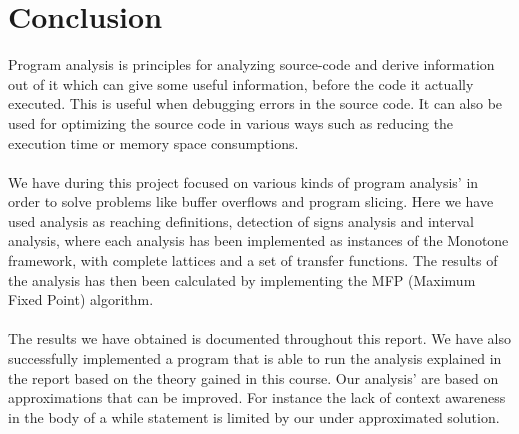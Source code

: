 \chapter{Conclusion}

Program analysis is principles for analyzing source-code and derive information out of it which can give some useful information, before the code it actually executed. This is useful when debugging errors in the source code. It can also be used for optimizing the source code in various ways such as reducing the execution time or memory space consumptions.
\\\\
We have during this project focused on various kinds of program analysis' in order to solve problems like buffer overflows and program slicing. Here we have used analysis as reaching definitions, detection of signs analysis and interval analysis, where each analysis has been implemented as instances of the Monotone framework, with complete lattices and a set of transfer functions.
The results of the analysis has then been calculated by implementing the MFP (Maximum Fixed Point) algorithm.
\\\\
The results we have obtained is documented throughout this report.
We have also successfully implemented a program that is able to run the analysis explained in the report based on the theory gained in this course. Our analysis' are based on approximations that can be improved. For instance the lack of context awareness in the body of a while statement is limited by our under approximated solution.